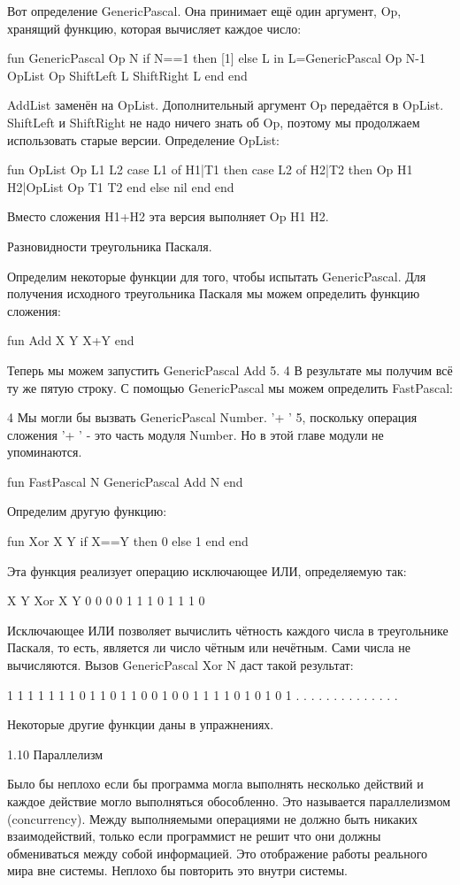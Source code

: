 Вот определение GenericPascal. Она принимает ещё один аргумент, Op, хранящий функцию, которая вычисляет каждое число:

fun {GenericPascal Op N}
if N==1 then [1]
else L in
L={GenericPascal Op N-1}
{OpList Op {ShiftLeft L} {ShiftRight L}}
end
end

AddList заменён на OpList. Дополнительный аргумент Op передаётся в OpList. ShiftLeft и ShiftRight не надо ничего знать об Op, поэтому мы продолжаем использовать старые версии. Определение OpList:

fun {OpList Op L1 L2}
case L1 of H1|T1 then
case L2 of H2|T2 then
{Op H1 H2}|{OpList Op T1 T2}
end
else nil end
end

Вместо сложения H1+H2 эта версия выполняет {Op H1 H2}.

Разновидности треугольника Паскаля.

Определим некоторые функции для того, чтобы испытать GenericPascal. Для получения исходного треугольника Паскаля мы можем определить функцию сложения:

fun {Add X Y} X+Y end

Теперь мы можем запустить {GenericPascal Add 5}. 4 В результате мы получим всё ту же пятую строку. С помощью GenericPascal мы можем определить FastPascal:

4 Мы могли бы вызвать {GenericPascal Number. '+ ' 5}, поскольку операция сложения  '+ ' - это часть модуля Number. Но в этой главе модули не упоминаются.

fun {FastPascal N} {GenericPascal Add N} end

Определим другую функцию:

fun {Xor X Y} if X==Y then 0 else 1 end end

Эта функция реализует операцию исключающее ИЛИ, определяемую так:

X Y {Xor X Y}
0 0 0
0 1 1
1 0 1
1 1 0

Исключающее ИЛИ позволяет вычислить чётность каждого числа в треугольнике Паскаля, то есть, является ли число чётным или нечётным. Сами числа не вычисляются. Вызов {GenericPascal Xor N} даст такой результат:

1
1
1
1
1
1
1
0
1
1
0
1
1
0
0
1
0
0
1
1
1
1
0
1
0
1
0
1
. . . . . . . . . . . . . .

Некоторые другие функции даны в упражнениях.

1.10 Параллелизм

Было бы неплохо если бы программа могла выполнять несколько действий и каждое действие могло выполняться обособленно. Это называется параллелизмом (concurrency). Между выполняемыми операциями не должно быть никаких взаимодействий, только если программист не решит что они должны обмениваться между собой информацией. Это отображение работы реального мира вне системы. Неплохо бы повторить это внутри системы.

